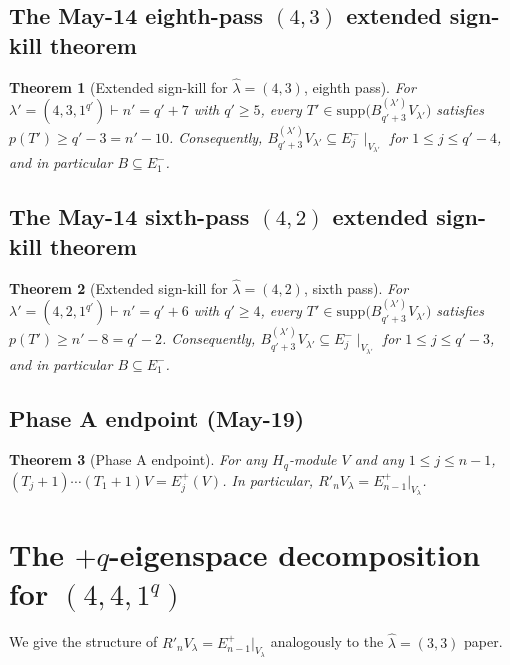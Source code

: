\documentclass[11pt]{article}
\newtheorem{theorem}{Theorem}
\theoremstyle{definition}
\newcommand{\Hq}{H_q}
\newcommand{\hatl}{\widehat\lambda}
\newcommand{\supp}{\mathrm{supp}}
\newcommand{\Rp}{{R'}}
\begin{document}
\subsection{The May-14 eighth-pass $(4, 3)$ extended sign-kill theorem}

\begin{theorem}[Extended sign-kill for $\hatl = (4, 3)$, eighth pass]\label{thm:43-prefix}
For $\lambda' = (4, 3, 1^{q'}) \vdash n' = q' + 7$ with $q' \ge 5$,
every $T' \in \supp\bigl(B^{(\lambda')}_{q'+3} V_{\lambda'}\bigr)$
satisfies $p(T') \ge q' - 3 = n' - 10$.  Consequently,
$B^{(\lambda')}_{q'+3} V_{\lambda'} \subseteq E_j^-\!\mid_{V_{\lambda'}}$
for $1 \le j \le q' - 4$, and in particular $B \subseteq E_1^-$.
\end{theorem}

\subsection{The May-14 sixth-pass $(4, 2)$ extended sign-kill theorem}

\begin{theorem}[Extended sign-kill for $\hatl = (4, 2)$, sixth pass]\label{thm:42-prefix}
For $\lambda' = (4, 2, 1^{q'}) \vdash n' = q' + 6$ with $q' \ge 4$,
every $T' \in \supp\bigl(B^{(\lambda')}_{q'+3} V_{\lambda'}\bigr)$
satisfies $p(T') \ge n' - 8 = q' - 2$.  Consequently,
$B^{(\lambda')}_{q'+3} V_{\lambda'} \subseteq E_j^-\!\mid_{V_{\lambda'}}$
for $1 \le j \le q' - 3$, and in particular $B \subseteq E_1^-$.
\end{theorem}

\subsection{Phase A endpoint (May-19)}

\begin{theorem}[Phase A endpoint]\label{thm:phaseA}
For any $\Hq$-module $V$ and any $1 \le j \le n-1$,
$(T_j+1)\cdots(T_1+1) V = E_j^+(V)$.  In particular,
$\Rp_n V_\lambda = E_{n-1}^+|_{V_\lambda}$.
\end{theorem}

\section{The $+q$-eigenspace decomposition for $(4,4,1^q)$}\label{sec:Eplus}

We give the structure of $\Rp_n V_\lambda = E_{n-1}^+|_{V_\lambda}$
analogously to the $\hatl = (3, 3)$ paper.
\end{document}
